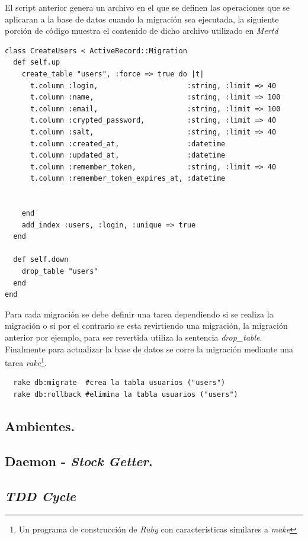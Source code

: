 El script anterior genera un archivo en el que se definen las operaciones que se aplicaran a la base de datos cuando la migración sea ejecutada, la siguiente porción de código muestra el contenido de dicho archivo utilizado en \emph{Mertd}

\begin{verbatim}
class CreateUsers < ActiveRecord::Migration
  def self.up
    create_table "users", :force => true do |t|
      t.column :login,                     :string, :limit => 40
      t.column :name,                      :string, :limit => 100
      t.column :email,                     :string, :limit => 100
      t.column :crypted_password,          :string, :limit => 40
      t.column :salt,                      :string, :limit => 40
      t.column :created_at,                :datetime
      t.column :updated_at,                :datetime
      t.column :remember_token,            :string, :limit => 40
      t.column :remember_token_expires_at, :datetime


    end
    add_index :users, :login, :unique => true
  end

  def self.down
    drop_table "users"
  end
end
\end{verbatim}

Para cada migración se debe definir una tarea dependiendo si se realiza la migración o si por el contrario se esta revirtiendo una migración, la migración anterior por ejemplo, para ser revertida utiliza la sentencia \emph{drop\_table}.\\

Finalmente para actualizar la base de datos se corre la migración mediante una tarea \emph{rake}\footnote{Un programa de construcción de \emph{Ruby} con características similares a \emph{make}}.

\begin{verbatim}
  rake db:migrate  #crea la tabla usuarios ("users")
  rake db:rollback #elimina la tabla usuarios ("users")
\end{verbatim}

\subsection{Ambientes.}
\subsection{Daemon - \emph{Stock Getter}.}
\subsection{\emph{TDD Cycle}}

